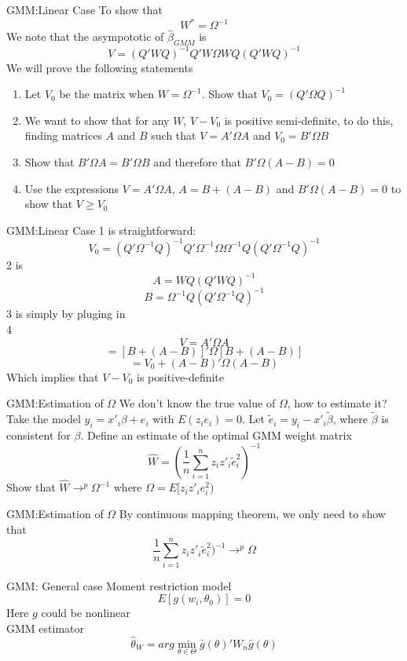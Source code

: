 \documentclass{beamer}
\begin{document}
\begin{frame}{GMM:Linear Case}
	To show that 
	\[W^* = \Omega^{-1}\]
	We note that the asympototic of $\hat{\beta}_{GMM}$ is
	\[V = (Q'WQ)^{-1} Q'W\Omega WQ(Q'WQ)^{-1}\]
	We will prove the following statements
	\begin{enumerate}
		\item Let $V_0$ be the matrix when $W = \Omega^{-1}$. Show that $V_0 = (Q'\Omega Q)^{-1}$
		\item We want to show that for any $W$, $V - V_0$ is positive semi-definite, to do this, finding matrices $A$ and $B$ such that $V = A' \Omega A$ and $V_0 = B'\Omega B$
		\item Show that $B' \Omega A = B'\Omega B$ and therefore that $B' \Omega (A-B) = 0$
		\item Use the expressions $V=A'\Omega A$,  $A=B+(A-B)$ and $B' \Omega(A-B)=0$ to show that $V \geq V_0$
	\end{enumerate}
\end{frame}
\begin{frame}{GMM:Linear Case}
1 is straightforward:
\[V_0 = (Q'\Omega^{-1}Q)^{-1} Q'\Omega^{-1} \Omega \Omega^{-1} Q(Q'\Omega^{-1}Q)^{-1}\]
2 is 
\[A = WQ(Q'WQ)^{-1}\]
\[B = \Omega^{-1}Q(Q'\Omega^{-1}Q)^{-1}\]
3 is simply by pluging in \\
4
\[V = A' \Omega A \]
\[=[B+(A-B)]' \Omega[B+(A-B)]\]
\[= V_0 + (A-B)'\Omega (A-B)\]
Which implies that $V-V_0$ is positive-definite
\end{frame}
\begin{frame}{GMM:Estimation of $\Omega$}
	We don't know the true value of $\Omega$, how to estimate it?
	Take the model $y_i = x'_i \beta +e_i$ with $E(z_i e_i)=0$. Let $\tilde{e}_i = y_i - x'_i \tilde{\beta}$, where $\tilde{\beta}$ is consistent for $\beta$. Define an estimate of the optimal GMM weight matrix
	\[\hat{W} = (\frac{1}{n} \sum^n_{i=1} z_iz'_i \tilde{e}^2_i)^{-1}\]
	Show that $\hat{W} \rightarrow^p \Omega^{-1}$ where $\Omega = E[z_iz'_ie^2_i)$
\end{frame}
\begin{frame}{GMM:Estimation of $\Omega$}
	By continuous mapping theorem, we only need to show that 
\[\frac{1}{n} \sum^n_{i=1} z_iz'_i \tilde{e}^2_i)^{-1} \rightarrow^p \Omega\]

\end{frame}
\begin{frame}{GMM: General case}
	Moment restriction model
	\[E[g(w_i,\theta_0)] = 0\]
	Here $g$ could be nonlinear \\
	GMM estimator
	\[\hat{\theta}_W = arg \min_{\theta \in \Theta} \bar{g}(\theta)' W_n \bar{g}(\theta)\]
\end{frame}
\end{document}
